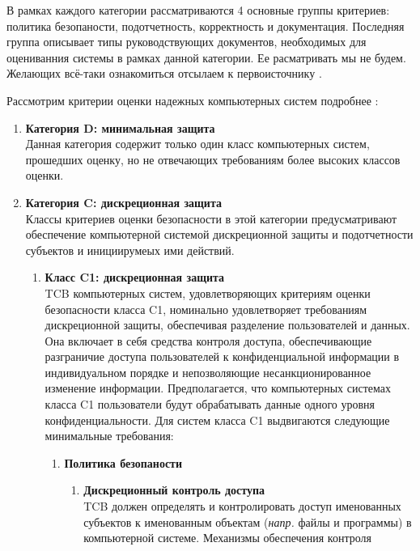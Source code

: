 В рамках каждого категории рассматриваются 4 основные группы критериев: политика безопаности, подотчетность, корректность и документация. Последняя группа описывает типы руководствующих 
документов, необходимых для оцениванния системы в рамках данной категории. Ее расматривать мы не будем. Желающих всё-таки ознакомиться отсылаем к первоисточнику \cite{OrangeBook}.

Рассмотрим критерии оценки надежных компьютерных систем подробнее \cite[Part 1]{OrangeBook}:

\begin{enumerate}
	\item{\textbf{Категория D: минимальная защита}}\\
	Данная категория содержит только один класс компьютерных систем, прошедших оценку, но не отвечающих требованиям более высоких классов оценки.
	\item{\textbf{Категория C: дискреционная защита}}\\
	Классы критериев оценки безопасности в этой категории предусматривают обеспечение компьютерной системой дискреционной защиты и подотчетности субъектов и инициирумеых ими действий.
	\begin{enumerate}
		\item{\textbf{Класс C1: дискреционная защита}}\\
		TCB компьютерных систем, удовлетворяющих критериям оценки безопасности класса C1, номинально удовлетворяет требованиям дискреционной защиты, обеспечивая разделение пользователей и данных.
		Она включает в себя средства контроля доступа, обеспечивающие разграничие доступа пользователей к конфиденциальной информации в индивидуальном порядке и непозволяющие несанкционированное
		изменение информации. Предполагается, что компьютерных системах класса C1 пользователи будут обрабатывать данные одного уровня конфиденциальности. Для систем класса C1 выдвигаются следующие
		минимальные требования:
		\begin{enumerate}
			\item{\textbf{Политика безопаности}}
			\begin{enumerate}
				\item{\textbf{Дискреционный контроль доступа}}\\
				TCB должен определять и контролировать доступ именованных субъектов к именованным объектам (\textit{напр.} файлы и программы) в компьютерной системе. Механизмы обеспечения контроля

\end{enumerate}
\end{enumerate}
\end{enumerate}
\end{enumerate}
